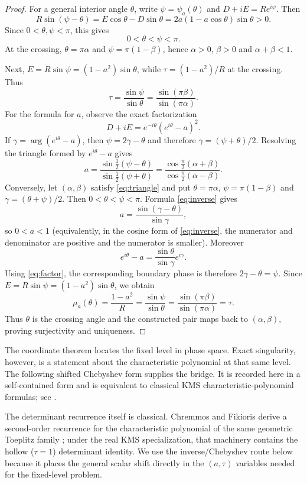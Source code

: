 \documentclass[11pt,reqno]{amsart}
\theoremstyle{plain}
\theoremstyle{definition}
\begin{document}
\begin{proof}
For a general interior angle $\theta$, write $\psi=\psi_a(\theta)$ and
$D+iE=Re^{i\psi}$.  Then
\[
R\sin(\psi-\theta)=E\cos\theta-D\sin\theta
=2a(1-a\cos\theta)\sin\theta>0.
\]
Since $0<\theta,\psi<\pi$, this gives
\[
0<\theta<\psi<\pi.
\]
At the crossing, $\theta=\pi\alpha$ and $\psi=\pi(1-\beta)$, hence
$\alpha>0$, $\beta>0$ and $\alpha+\beta<1$.

Next, $E=R\sin\psi=(1-a^2)\sin\theta$, while
$\tau=(1-a^2)/R$ at the crossing.  Thus
\[
\tau=\frac{\sin\psi}{\sin\theta}
=\frac{\sin(\pi\beta)}{\sin(\pi\alpha)}.
\]
For the formula for $a$, observe the exact factorization
\begin{equation}\label{eq:factor}
D+iE=e^{-i\theta}(e^{i\theta}-a)^2.
\end{equation}
If $\gamma=\arg(e^{i\theta}-a)$, then $\psi=2\gamma-\theta$ and therefore
$\gamma=(\psi+\theta)/2$.  Resolving the triangle formed by
$e^{i\theta}-a$ gives
\[
a=\frac{\sin\frac12(\psi-\theta)}
        {\sin\frac12(\psi+\theta)}
 =\frac{\cos\frac\pi2(\alpha+\beta)}
        {\cos\frac\pi2(\alpha-\beta)}.
\]
Conversely, let $(\alpha,\beta)$ satisfy \eqref{eq:triangle} and put
$\theta=\pi\alpha$, $\psi=\pi(1-\beta)$ and
$\gamma=(\theta+\psi)/2$.  Then $0<\theta<\psi<\pi$.  Formula
\eqref{eq:inverse} gives
\[
a=\frac{\sin(\gamma-\theta)}{\sin\gamma},
\]
so $0<a<1$ (equivalently, in the cosine form of \eqref{eq:inverse}, the numerator
and denominator are positive and the numerator is smaller).  Moreover
\[
e^{i\theta}-a=\frac{\sin\theta}{\sin\gamma}e^{i\gamma}.
\]
Using \eqref{eq:factor}, the corresponding boundary phase is therefore
$2\gamma-\theta=\psi$.  Since
$E=R\sin\psi=(1-a^2)\sin\theta$, we obtain
\[
\mu_a(\theta)=\frac{1-a^2}{R}
=\frac{\sin\psi}{\sin\theta}
=\frac{\sin(\pi\beta)}{\sin(\pi\alpha)}=\tau.
\]
Thus $\theta$ is the crossing angle and the constructed pair maps back to
$(\alpha,\beta)$, proving surjectivity and uniqueness.
\end{proof}

The coordinate theorem locates the fixed level in phase space.  Exact singularity,
however, is a statement about the characteristic polynomial at that same level.
The following shifted Chebyshev form supplies the bridge.  It is recorded here in a
self-contained form and is equivalent to classical KMS characteristic-polynomial
formulas; see \cite{Fikioris2018}.

The determinant recurrence itself is classical.  Chremmos and Fikioris derive a
second-order recurrence for the characteristic polynomial of the same geometric
Toeplitz family \cite{ChremmosFikioris2016}; under the real KMS specialization, that
machinery contains the hollow ($\tau=1$) determinant identity.  We use the
inverse/Chebyshev route below because it places the general scalar shift directly in
the $(a,\tau)$ variables needed for the fixed-level problem.
\end{document}
